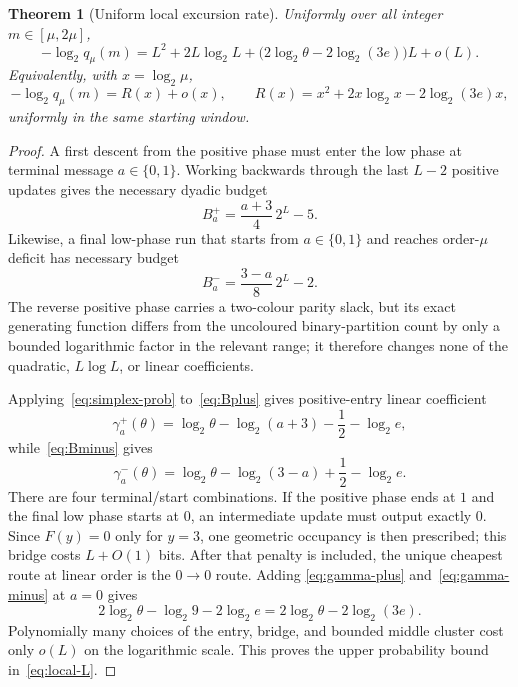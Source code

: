 \documentclass[11pt]{article}
\newtheorem{theorem}{Theorem}[section]
\begin{document}
\begin{theorem}[Uniform local excursion rate]\label{thm:local-rate}
Uniformly over all integer $m\in[\mu,2\mu]$,
\[
 -\log_2q_\mu(m)
 =L^2+2L\log_2L
  +\bigl(2\log_2\theta-2\log_2(3e)\bigr)L+o(L).
 \tag{5.10}\label{eq:local-L}
\]
Equivalently, with $x=\log_2\mu$,
\[
 -\log_2q_\mu(m)
 =R(x)+o(x),
 \qquad
 R(x)=x^2+2x\log_2x-2\log_2(3e)x,
 \tag{5.11}\label{eq:local-x}
\]
uniformly in the same starting window.
\end{theorem}

\begin{proof}
A first descent from the positive phase must enter the low phase at terminal
message $a\in\{0,1\}$.  Working backwards through the last $L-2$ positive
updates gives the necessary dyadic budget
\[
 B_a^+=\frac{a+3}{4}\,2^L-5.
 \tag{5.12}\label{eq:Bplus}
\]
Likewise, a final low-phase run that starts from $a\in\{0,1\}$ and reaches
order-$\mu$ deficit has necessary budget
\[
 B_a^-=\frac{3-a}{8}\,2^L-2.
 \tag{5.13}\label{eq:Bminus}
\]
The reverse positive phase carries a two-colour parity slack, but its exact
generating function differs from the uncoloured binary-partition count by
only a bounded logarithmic factor in the relevant range; it therefore changes
none of the quadratic, $L\log L$, or linear coefficients.

Applying~\eqref{eq:simplex-prob} to~\eqref{eq:Bplus} gives positive-entry
linear coefficient
\[
 \gamma_a^+(\theta)
 =\log_2\theta-\log_2(a+3)-\frac12-\log_2e,
 \tag{5.14}\label{eq:gamma-plus}
\]
while~\eqref{eq:Bminus} gives
\[
 \gamma_a^-(\theta)
 =\log_2\theta-\log_2(3-a)+\frac12-\log_2e.
 \tag{5.15}\label{eq:gamma-minus}
\]
There are four terminal/start combinations.  If the positive phase ends at
$1$ and the final low phase starts at $0$, an intermediate update must output
exactly $0$.  Since $F(y)=0$ only for $y=3$, one geometric occupancy is then
prescribed; this bridge costs $L+O(1)$ bits.  After that penalty is included,
the unique cheapest route at linear order is the $0\to0$ route.  Adding
\eqref{eq:gamma-plus} and~\eqref{eq:gamma-minus} at $a=0$ gives
\[
 2\log_2\theta-\log_2 9-2\log_2e
 =2\log_2\theta-2\log_2(3e).
\]
Polynomially many choices of the entry, bridge, and bounded middle cluster
cost only $o(L)$ on the logarithmic scale.  This proves the upper probability
bound in~\eqref{eq:local-L}.


\end{proof}
\end{document}
